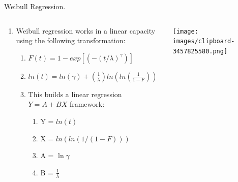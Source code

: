 \documentclass[
  ignorenonframetext,
]{beamer}
\providecommand{\tightlist}{%
  \setlength{\itemsep}{0pt}\setlength{\parskip}{0pt}}
\begin{document}
\begin{frame}{Weibull Regression.}
\label{weibull-regression.}
\begin{columns}[T]
\begin{column}{0.6\textwidth}
\begin{enumerate}
\tightlist
\item
  Weibull regression works in a linear capacity using the following
  transformation:

  \begin{enumerate}
  \tightlist
  \item
    \(F(t) = 1 - exp[(-(t/\lambda)^\gamma)]\)
  \item
    \(ln(t) = ln(\gamma) + (\frac{1}{\lambda})ln(ln(\frac{1}{1-F}))\)
  \item
    This builds a linear regression \(Y=A+BX\) framework:

    \begin{enumerate}
    \tightlist
    \item
      Y = \(ln(t)\)
    \item
      X = \(ln(ln(1/(1-F)))\)
    \item
      A = \(\ln{\gamma}\)
    \item
      B = \(\frac{1}{\lambda}\)
    \end{enumerate}
  \end{enumerate}
\end{enumerate}
\end{column}

\begin{column}{0.4\textwidth}
\texttt{[image: images/clipboard-3457825580.png]}
\end{column}
\end{columns}
\end{frame}
\end{document}

